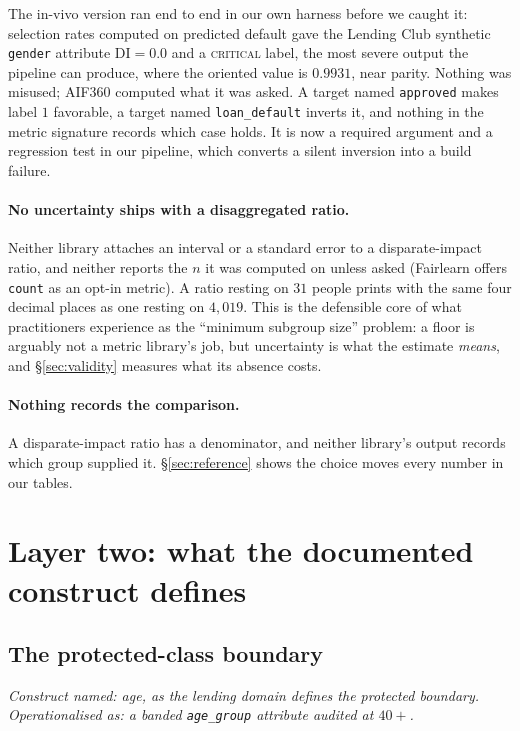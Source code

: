 \documentclass[sigconf,nonacm]{acmart}
\begin{document}
The in-vivo version ran end to end in our own harness before we caught it:
selection rates computed on predicted default gave the Lending Club synthetic
\texttt{gender} attribute $\mathrm{DI}=0.0$ and a \textsc{critical} label,
the most severe output the pipeline can produce, where the oriented value
is $0.9931$, near parity. Nothing was misused; AIF360 computed what it was
asked. A target named \texttt{approved} makes label $1$ favorable, a target
named \texttt{loan\_default} inverts it, and nothing in the metric signature
records which case holds. It is now a required argument and a regression test
in our pipeline, which converts a silent inversion into a build failure.

\paragraph{No uncertainty ships with a disaggregated ratio.} Neither library
attaches an interval or a standard error to a disparate-impact ratio, and
neither reports the $n$ it was computed on unless asked (Fairlearn offers
\texttt{count} as an opt-in metric). A ratio resting on $31$ people prints
with the same four decimal places as one resting on $4{,}019$. This is the
defensible core of what practitioners experience as the ``minimum subgroup
size'' problem: a floor is arguably not a metric library's job, but
uncertainty is what the estimate \emph{means}, and \S\ref{sec:validity}
measures what its absence costs.

\paragraph{Nothing records the comparison.} A disparate-impact ratio has a
denominator, and neither library's output records which group supplied it.
\S\ref{sec:reference} shows the choice moves every number in our tables.

\section{Layer two: what the documented construct defines}
\label{sec:statute}

\subsection{The protected-class boundary}
\label{sec:age}

\emph{Construct named: age, as the lending domain defines the protected
boundary. Operationalised as: a banded \texttt{age\_group} attribute audited
at $40{+}$.}
\end{document}

